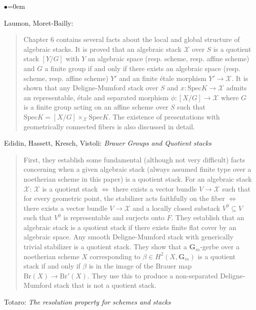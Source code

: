 \begin{list}{$\bullet$}{\leftmargin=0em}
\item Laumon, Moret-Bailly: \cite[Chapter 6]{lmb} 
\begin{quote}
Chapter 6 contains several facts about the local and global structure of 
algebraic stacks. It is proved that an algebraic stack $\mathcal{X}$ over $S$ 
is a 
quotient stack $[Y/G]$ with $Y$ an algebraic space (resp. scheme, resp. affine 
scheme) and $G$ a finite group if and only if there exists an algebraic space 
(resp. scheme, resp. affine scheme) $Y'$ and an finite \'etale morphism $Y' 
\to \mathcal{X}$. It is shown that any Deligne-Mumford stack over $S$ and $x: 
\text{Spec} K 
\to \mathcal{X}$ admits an representable, \'etale and separated morphism $\phi: 
[X/G] 
\to \mathcal{X}$ where $G$ is a finite group acting on an affine scheme over 
$S$ such 
that $\text{Spec} K = [X/G] \times_{\mathcal{X}} \text{Spec} K$. The existence 
of presentations 
with geometrically connected fibers is also discussed in detail.
\end{quote}
\smallskip
\item
Edidin, Hassett, Kresch, Vistoli:
\emph{Brauer Groups and Quotient stacks} \cite{ehkv}
\begin{quote}
First, they establish some fundamental (although not very difficult)
facts concerning 
when a given algebraic stack (always assumed finite type over a noetherian 
scheme in this paper) is a quotient stack. For an algebraic stack 
$\mathcal{X}$: 
$\mathcal{X}$ is a quotient stack $\iff$ there exists a vector bundle $V \to 
\mathcal{X}$ such 
that for every geometric point, the stabilizer acts faithfully on the fiber 
$\iff$ there exists a vector bundle $V \to \mathcal{X}$ and a locally closed 
substack 
$V^0 \subseteq V$ such that $V^0$ is representable and surjects onto $F$. They 
establish that an algebraic stack is a quotient stack if there exists finite 
flat cover by an algebraic space. Any smooth Deligne-Mumford stack with 
generically trivial stabilizer is a quotient stack.
They show that a $\mathbf{G}_m$-gerbe over a noetherian scheme $X$ 
corresponding to 
$\beta \in H^2(X, \mathbf{G}_m)$ is a quotient stack if and only if $\beta$ is 
in the 
image of the Brauer map $\text{Br}(X) \to \text{Br}'(X)$. They use this to 
produce a 
non-separated Deligne-Mumford stack that is not a quotient stack. 
\end{quote}
\smallskip
\item Totaro: \emph{The resolution property for schemes and stacks} 
\cite{totaro_resolution}

\end{list}
